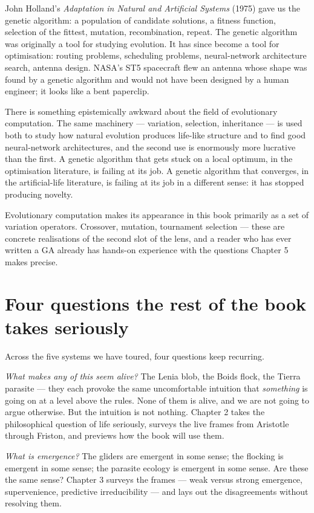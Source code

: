 John Holland's \textit{Adaptation in Natural and Artificial Systems}
(1975) gave us the genetic algorithm: a population of candidate
solutions, a fitness function, selection of the fittest, mutation,
recombination, repeat. The genetic algorithm was originally a tool for
studying evolution. It has since become a tool for optimisation:
routing problems, scheduling problems, neural-network architecture
search, antenna design. NASA's ST5 spacecraft flew an antenna whose
shape was found by a genetic algorithm and would not have been designed
by a human engineer; it looks like a bent paperclip.

There is something epistemically awkward about the field of
evolutionary computation. The same machinery --- variation, selection,
inheritance --- is used both to study how natural evolution produces
life-like structure and to find good neural-network architectures, and
the second use is enormously more lucrative than the first. A genetic
algorithm that gets stuck on a local optimum, in the optimisation
literature, is failing at its job. A genetic algorithm that converges,
in the artificial-life literature, is failing at its job in a different
sense: it has stopped producing novelty.

Evolutionary computation makes its appearance in this book primarily
as a set of variation operators. Crossover, mutation, tournament
selection --- these are concrete realisations of the second slot of
the lens, and a reader who has ever written a GA already has hands-on
experience with the questions Chapter 5 makes precise.

\section{Four questions the rest of the book takes seriously}

Across the five systems we have toured, four questions keep recurring.

\textit{What makes any of this seem alive?} The Lenia blob, the Boids
flock, the Tierra parasite --- they each provoke the same uncomfortable
intuition that \emph{something} is going on at a level above the rules.
None of them is alive, and we are not going to argue otherwise. But the
intuition is not nothing. Chapter 2 takes the philosophical question of
life seriously, surveys the live frames from Aristotle through Friston,
and previews how the book will use them.

\textit{What is emergence?} The gliders are emergent in some sense; the
flocking is emergent in some sense; the parasite ecology is emergent in
some sense. Are these the same sense? Chapter 3 surveys the frames ---
weak versus strong emergence, supervenience, predictive irreducibility
--- and lays out the disagreements without resolving them.

